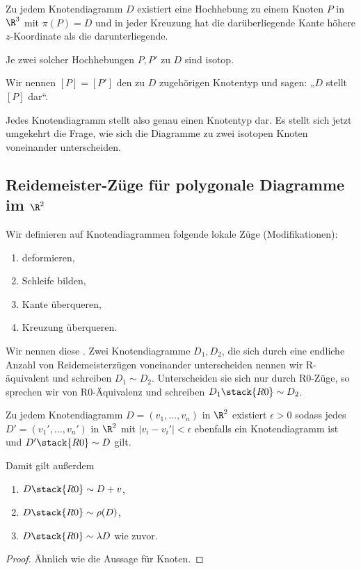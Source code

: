 \begin{lem}
    Zu jedem Knotendiagramm $D$ existiert eine Hochhebung zu einem Knoten $P$ in $\R^3$ mit $\pi(P) = D$ und in jeder Kreuzung hat die darüberliegende Kante höhere $z$-Koordinate als die darunterliegende.

    Je zwei solcher Hochhebungen $P, P'$ zu $D$ sind isotop.

    Wir nennen $[P] = [P']$ den zu $D$ zugehörigen Knotentyp und sagen: „$D$ stellt $[P]$ dar“.
\end{lem}

Jedes Knotendiagramm stellt also genau einen Knotentyp dar.
Es stellt sich jetzt umgekehrt die Frage, wie sich die Diagramme zu zwei isotopen Knoten voneinander unterscheiden.

\subsection{Reidemeister-Züge für polygonale Diagramme im \texorpdfstring{$\R^2$}{ℝ²}}

\begin{df}
    Wir definieren auf Knotendiagrammen folgende lokale Züge (Modifikationen):
    \begin{enumerate}[(R1),start=0,leftmargin=3em]
        \item deformieren,
        \item Schleife bilden,
        \item Kante überqueren,
        \item Kreuzung überqueren.
    \end{enumerate}
    Wir nennen diese .
    Zwei Knotendiagramme $D_1, D_2$, die sich durch eine endliche Anzahl von Reidemeisterzügen voneinander unterscheiden nennen wir R-äquivalent und schreiben $D_1 \sim D_2$.
    Unterscheiden sie sich nur durch R0-Züge, so sprechen wir von R0-Äquivalenz und schreiben $D_1 \stack{R0}\sim D_2$.
\end{df}

\begin{lem}
    Zu jedem Knotendiagramm $D = (v_1, \dotsc, v_n)$ in $\R^2$ existiert $\epsilon > 0$ sodass jedes $D' = (v_1', \dotsc, v_n')$ in $\R^2$ mit $|v_i - v_i'| < \epsilon$ ebenfalls ein Knotendiagramm ist und $D' \stack{R0}\sim D$ gilt.

    Damit gilt außerdem
    \begin{enumerate}[(1)]
        \item
            $D \stack{R0}\sim D + v$,
        \item
            $D \stack{R0}\sim \rho(D)$,
        \item
            $D \stack{R0}\sim \lambda D$ wie zuvor.
    \end{enumerate}
    \begin{proof}
        Ähnlich wie die Aussage für Knoten.
    \end{proof}
\end{lem}

